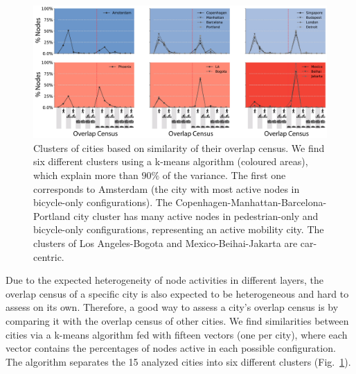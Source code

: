 \begin{figure}[t!]
	\centering
	\includegraphics[width=\textwidth]{images/multiplex/ResultsOverlapCensus-01.png}
	\caption[Overlap Census clusters]{
		Clusters of cities based on similarity of their overlap census. We find six different clusters using a k-means algorithm (coloured areas), which explain more than $90\%$ of the variance. The first one corresponds to Amsterdam (the city with most active nodes in bicycle-only configurations). The Copenhagen-Manhattan-Barcelona-Portland city cluster has many active nodes in pedestrian-only and bicycle-only configurations, representing an active mobility city. The clusters of Los Angeles-Bogota and Mexico-Beihai-Jakarta are car-centric.
		}
	\label{fig:ResultsOverlapCensus}
\end{figure}

Due to the expected heterogeneity of node activities in different layers, the overlap census of a specific city is also expected to be heterogeneous and hard to assess on its own. Therefore, a good way to assess a city's overlap census is by comparing it with the overlap census of other cities. We find similarities between cities via a k-means algorithm fed with fifteen vectors (one per city), where each vector contains the percentages of nodes active in each possible configuration. The algorithm separates the 15 analyzed cities into six different clusters (Fig.~\ref{fig:ResultsOverlapCensus}).

